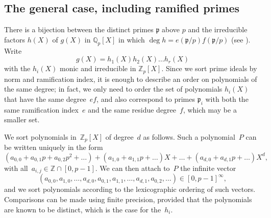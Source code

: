 \documentclass{article}
\def\Z{{\mathbb Z}}
\def\Q{{\mathbb Q}}
\def\p{{\mathfrak p}}
\DeclareMathOperator{\disc}{disc}
\begin{document}
\subsection{The general case, including ramified primes}

There is a bijection between the distinct primes $\p$ above $p$ and
the irreducible factors $h(X)$ of $g(X)$ in $\Q_p[X]$ in which $\deg h
= e(\p/p)f(\p/p)$ (see \cite[Theorem 3.8 (d)]{Janusz}).  Write
\[
  g(X) = h_1(X)h_2(X)\dots h_r(X)
\]
with the $h_i(X)$ monic and irreducible in $\Z_p[X]$. Since we sort
prime ideals by norm and ramification index, it is enough to describe
an order on polynomials of the same degree; in fact, we only need to
order the set of polynomials $h_i(X)$ that have the same degree~$ef$,
and also correspond to primes $\p_i$ with both the same ramification
index~$e$ and the same residue degree~$f$, which may be a smaller set.

We sort polynomials in~$\Z_p[X]$ of degree~$d$ as follows. Such a polynomial~$P$
can be written uniquely in the form
\[
  (a_{0,0}+a_{0,1}p+a_{0,2}p^2+\dots) + (a_{1,0}+a_{1,1}p+\dots)X
  + \dots + (a_{d,0}+a_{d,1}p+\dots)X^d,
\]
with all~$a_{i,j}\in\Z\cap[0,p-1]$. We can then attach to~$P$ the infinite
vector
\[
(a_{0,0},a_{1,0},\dots,a_{d,0},a_{0,1},a_{1,1},\dots,a_{d,1},a_{0,2},\dots)\in [0,p-1]^\infty,
\]
and we sort polynomials according to the lexicographic ordering of such vectors.
Comparisons can be made using finite precision, provided that the polynomials are known to be
distinct, which is the case for the~$h_i$.

\end{document}
